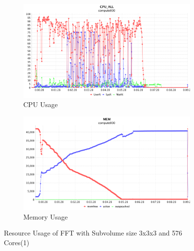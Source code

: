 \begin{figure}[h]
\centering
\begin{subfigure}{1\textwidth}
  \centering
  \includegraphics[width=1\linewidth]{figures/FFT131_576_CPU.png}
  \caption{CPU Usage}
  \label{FFT131_576_CPU}
\end{subfigure}
\begin{subfigure}{1\textwidth}
  \centering
  \includegraphics[width=1\linewidth]{figures/FFT131_576_MEM.png}
  \caption{Memory Usage}
  \label{FFT131_576_MEM}
\end{subfigure}
\caption{Resource Usage of FFT with Subvolume size 3x3x3 and 576 Cores(1)}
\label{FFT131_576}
\end{figure}

